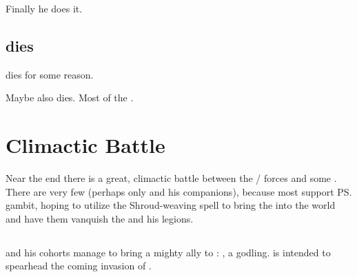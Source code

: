 \begin{garbage}
Finally he does it. 









\subsection{\Harbeth{} dies}
\Harbeth{} dies for some reason. 

Maybe \Zereth{} also dies. 
Most of the . 















\section{Climactic Battle}
Near the end there is a great, climactic battle between the \bane/\resphan{} forces and some . 
There are very few \dragons{} (perhaps only \Ishnaruchaefir{} and his companions), because most \dragons{} support \ps{\Secherdamon} gambit, hoping to utilize the \banesz{} Shroud-weaving spell to bring the \firstgendragons{} into the world and have them vanquish the \Voidbringer{} and his legions.







\subsection{\HothNrul}
\Vizsherioch{} and his cohorts manage to bring a mighty ally to \Miith: 
\hs{\HothNrul}, a \xsic{} godling. 
\HothNrul{} is intended to spearhead the coming \xs{} invasion of \Miith. 


\end{garbage}
